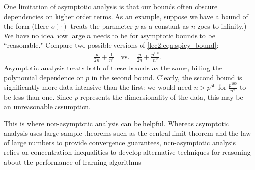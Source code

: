 
\label{sec:limit-asymp}

One limitation of asymptotic analysis is that our bounds often obscure dependencies on higher order terms. As an example, suppose we have a bound of the form
(Here $o(\cdot)$ treats the parameter $p$ as a constant as $n$ goes to infinity.) 
We have no idea how large $n$ needs to be for asymptotic bounds to be ``reasonable." Compare two possible versions of \eqref{lec2:eqn:spicy_bound}: 
\begin{align}
    \frac{p}{2n} + \frac{1}{n^2} \quad \text{vs.} \quad \frac{p}{2n} + \frac{p^{100}}{n^2}.
\end{align}
Asymptotic analysis treats both of these bounds as the same, hiding the polynomial dependence on $p$ in the second bound. Clearly, the second bound is significantly more data-intensive than the first: we would need $n > p^{50}$ for $\frac{p^{100}}{n^2}$ to be less than one. Since $p$ represents the dimensionality of the data, this may be an unreasonable assumption.

This is where non-asymptotic analysis can be helpful. Whereas asymptotic analysis uses large-sample theorems such as the central limit theorem and the law of large numbers to provide convergence guarantees, non-asymptotic analysis relies on concentration inequalities to develop alternative techniques for reasoning about the performance of learning algorithms.

